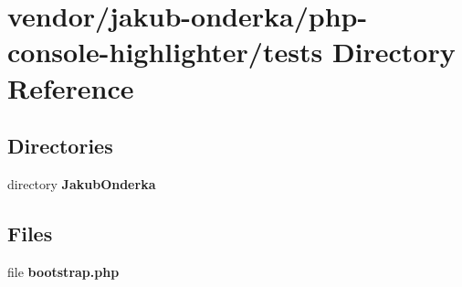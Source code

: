 \section{vendor/jakub-\/onderka/php-\/console-\/highlighter/tests Directory Reference}
\label{dir_8d7dd139f31d5ac754aae7b6f9be4d6e}
\subsection*{Directories}
\begin{DoxyCompactItemize}
\item 
directory {\bf Jakub\+Onderka}
\end{DoxyCompactItemize}
\subsection*{Files}
\begin{DoxyCompactItemize}
\item 
file {\bf bootstrap.\+php}
\end{DoxyCompactItemize}
